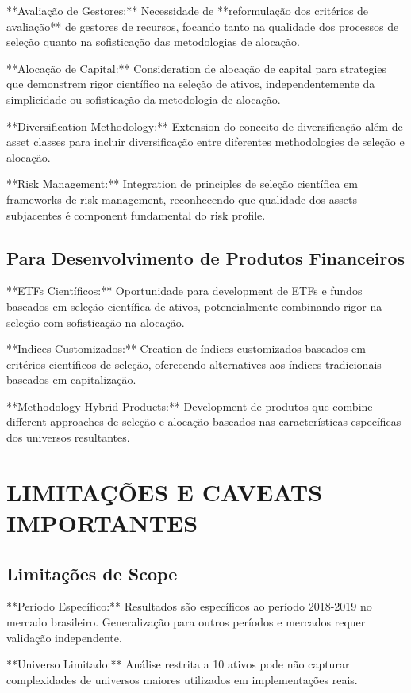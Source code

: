 **Avaliação de Gestores:** Necessidade de **reformulação dos critérios de avaliação** de gestores de recursos, focando tanto na qualidade dos processos de seleção quanto na sofisticação das metodologias de alocação.

**Alocação de Capital:** Consideration de alocação de capital para strategies que demonstrem rigor científico na seleção de ativos, independentemente da simplicidade ou sofisticação da metodologia de alocação.

**Diversification Methodology:** Extension do conceito de diversificação além de asset classes para incluir diversificação entre diferentes methodologies de seleção e alocação.

**Risk Management:** Integration de principles de seleção científica em frameworks de risk management, reconhecendo que qualidade dos assets subjacentes é component fundamental do risk profile.

\subsection{Para Desenvolvimento de Produtos Financeiros}

**ETFs Científicos:** Oportunidade para development de ETFs e fundos baseados em seleção científica de ativos, potencialmente combinando rigor na seleção com sofisticação na alocação.

**Indices Customizados:** Creation de índices customizados baseados em critérios científicos de seleção, oferecendo alternatives aos índices tradicionais baseados em capitalização.

**Methodology Hybrid Products:** Development de produtos que combine different approaches de seleção e alocação baseados nas características específicas dos universos resultantes.

\section{LIMITAÇÕES E CAVEATS IMPORTANTES}

\subsection{Limitações de Scope}

**Período Específico:** Resultados são específicos ao período 2018-2019 no mercado brasileiro. Generalização para outros períodos e mercados requer validação independente.

**Universo Limitado:** Análise restrita a 10 ativos pode não capturar complexidades de universos maiores utilizados em implementações reais.

